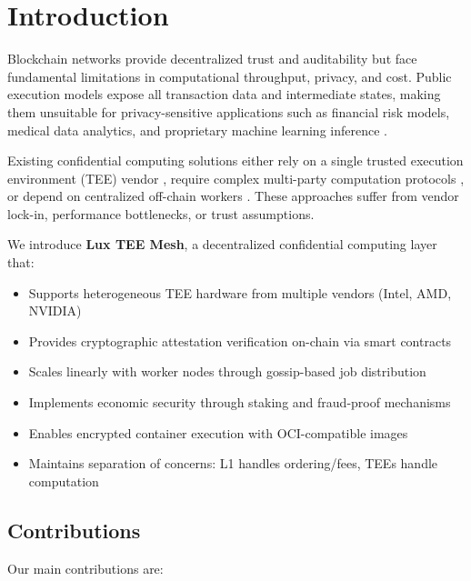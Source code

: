 \section{Introduction}


Blockchain networks provide decentralized trust and auditability but face fundamental limitations in computational throughput, privacy, and cost. Public execution models expose all transaction data and intermediate states, making them unsuitable for privacy-sensitive applications such as financial risk models, medical data analytics, and proprietary machine learning inference \cite{ethereum-privacy,lux-appchains}.

Existing confidential computing solutions either rely on a single trusted execution environment (TEE) vendor \cite{secret-network,oasis-sapphire}, require complex multi-party computation protocols \cite{mpc-overview}, or depend on centralized off-chain workers \cite{iexec,truebit}. These approaches suffer from vendor lock-in, performance bottlenecks, or trust assumptions.

We introduce \textbf{Lux TEE Mesh}, a decentralized confidential computing layer that:

\begin{itemize}
  \item Supports heterogeneous TEE hardware from multiple vendors (Intel, AMD, NVIDIA)
  \item Provides cryptographic attestation verification on-chain via smart contracts
  \item Scales linearly with worker nodes through gossip-based job distribution
  \item Implements economic security through staking and fraud-proof mechanisms
  \item Enables encrypted container execution with OCI-compatible images
  \item Maintains separation of concerns: L1 handles ordering/fees, TEEs handle computation
\end{itemize}

\subsection{Contributions}

Our main contributions are:


